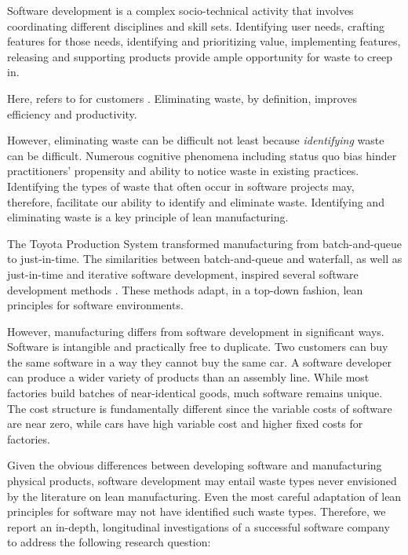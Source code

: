 Software development is a complex socio-technical activity that involves coordinating different disciplines and skill sets. Identifying user needs, crafting features for those needs, identifying and prioritizing value, implementing features, releasing and supporting products provide ample opportunity for waste to creep in. 

Here,  refers to  for customers \cite{WomackLeanThinking}. Eliminating waste, by definition, improves efficiency and productivity. 

However, eliminating waste can be difficult not least because \textit{identifying} waste can be difficult.  Numerous cognitive phenomena including status quo bias \cite{JostDecadeOfSystemJustification} hinder practitioners' propensity and ability to notice waste in existing practices. Identifying the types of waste that often occur in software projects  may, therefore, facilitate our ability to identify and eliminate waste. Identifying and eliminating waste is a key principle of lean manufacturing. 

The Toyota Production System \cite{OhnoToyotaProductionSystem, ShingoToyotaProductionSystem} transformed manufacturing from batch-and-queue to just-in-time. The similarities between batch-and-queue and waterfall, as well as just-in-time and iterative software development, inspired several software development methods \cite{PoppendieckLeanSoftwareDevelopment, AndersonKanban}. These methods adapt, in a top-down fashion, lean principles for software environments. 

However, manufacturing differs from software development in significant ways. Software is intangible and practically free to duplicate. Two customers can buy the same software in a way they cannot buy the same car. A software developer can produce a wider variety of products than an assembly line. While most factories build batches of near-identical goods, much software remains unique. The cost structure is fundamentally different since the variable costs of software are near zero, while cars have high variable cost and higher fixed costs for factories. 

Given the obvious differences between developing software and manufacturing physical products, software development may entail waste types never envisioned by the literature on lean manufacturing. Even the most careful adaptation of lean principles for software may not have identified such waste types. Therefore, we report an in-depth, longitudinal investigations of a successful software company to address the following research question: 


